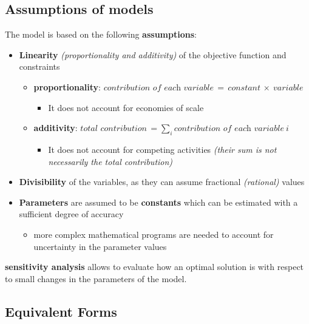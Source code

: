 \documentclass[english]{article}
\begin{document}
\subsection{Assumptions of \LP models}

The \LP model is based on the following \textbf{assumptions}:

\begin{itemize}
  \item \textbf{Linearity} \textit{(proportionality and additivity)} of the objective function and constraints
        \begin{itemize}[label=\(\rightarrow\)]
          \item \textbf{proportionality}: \( \textit{contribution of each variable} \, = \, \textit{constant} \, \times \ \textit{variable} \)
                \begin{itemize}[label=\xmarkthin]
                  \item It does not account for economies of scale
                \end{itemize}
          \item \textbf{additivity}: \(\textit{total contribution} \, =\sum_i \textit{contribution of each variable} \ i\)
                \begin{itemize}[label=\xmarkthin]
                  \item It does not account for competing activities \textit{(their sum is not necessarily the total contribution)}
                \end{itemize}
        \end{itemize}
  \item \textbf{Divisibility} of the variables, as they can assume fractional \textit{(rational)} values
  \item \textbf{Parameters} are assumed to be \textbf{constants} which can be estimated with a sufficient degree of accuracy
        \begin{itemize}[label=\xmarkthin]
          \item more complex mathematical programs are needed to account for uncertainty in the parameter values
        \end{itemize}
\end{itemize}

\LP \textbf{sensitivity analysis} allows to evaluate how  an optimal solution is with respect to small changes in the parameters of the model. %

\subsection{Equivalent Forms}
\end{document}
